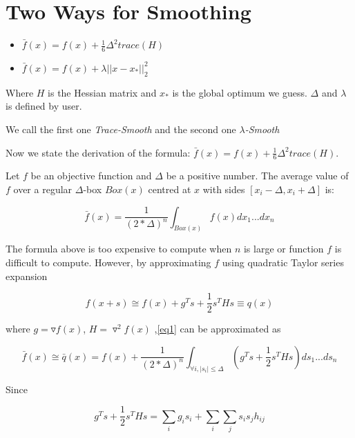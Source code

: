 \documentclass[letterpaper,12pt,titlepage,oneside,final]{book}
\begin{document}
\section{Two Ways for Smoothing}

\begin{itemize}

\item $\bar{f}(x)=f(x)+\frac{1}{6}\Delta^2trace(H)$

\item $\bar{f}(x)=f(x)+\lambda||x-x_*||_2^2$

\end{itemize}

Where $H$ is the Hessian matrix and $x_*$ is the global optimum we guess. $\Delta$ and $\lambda$ is defined by user.

We call the first one \emph{Trace-Smooth} and the second one \emph{$\lambda$-Smooth}

Now we state the derivation of the formula: $\bar{f}(x)=f(x)+\frac{1}{6}\Delta^2trace(H)$.

Let $f$ be an objective function and $\Delta$ be a positive number. The average value of $f$ over a regular
$\Delta$-box $Box(x)$ centred at $x$ with sides $[x_i-\Delta ,x_i+\Delta ]$ is:

\begin{equation} \label{eq1}
\bar{f}(x)=\frac{1}{(2\ast\Delta)^n}\int_{Box(x)}f(x)dx_1...dx_n
\end{equation}

The formula above is too expensive to compute when $n$ is large or function $f$ is difficult to
compute. However, by approximating $f$ using quadratic Taylor series expansion

\begin{equation}
f(x+s)\cong f(x)+g^Ts+\frac{1}{2}s^THs\equiv q(x)
\end{equation}

where $g=\triangledown f(x)$, $H=\triangledown^2f(x)$ ,\ref{eq1} can be approximated as

\begin{equation}
\bar{f}(x)\cong \bar{q}(x)=f(x)+\frac{1}{(2\ast\Delta)^n}\int_{\forall i,|s_i|\leq\Delta}(g^Ts+\frac{1}{2}s^THs)ds_1...ds_n
\end{equation}

Since 

\begin{equation}
g^Ts+\frac{1}{2}s^THs=\sum_ig_is_i+\sum_i\sum_js_is_jh_{ij}
\end{equation}
\end{document}
